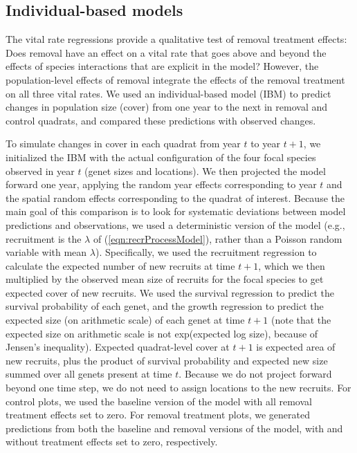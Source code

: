 \documentclass[11pt]{article}
\begin{document}
\begin{doublespacing}
\subsection*{Individual-based models}
The vital rate regressions provide a qualitative test of removal treatment effects: Does removal have an effect on a vital rate that goes above and beyond the effects of species interactions that are explicit in the model? However, the population-level effects of removal integrate the effects of the removal treatment on all three vital rates. We used an individual-based model (IBM) to predict changes in population size (cover) from one year to the next in removal and control quadrats, and compared these predictions with observed changes. 

To simulate changes in cover in each quadrat from year $t$ to year $t+1$, we initialized the IBM with the actual configuration of the four focal species observed in year $t$ (genet sizes and locations). 
We then projected the model forward one year, applying the random year effects corresponding to year $t$ and the spatial random effects corresponding to the quadrat of interest. Because the main goal of this 
comparison is to look for systematic deviations between model predictions and observations, we used a deterministic version of the model (e.g., 
recruitment is the $\lambda$ of (\ref{eqn:recrProcessModel}), rather than a Poisson random variable with mean $\lambda$). Specifically, we used the recruitment regression to calculate 
the expected number of new recruits at time $t+1$, which we then multiplied by the observed mean size of recruits for the focal species to get expected cover of new recruits. 
We used the survival regression to predict the survival probability of each genet, and the growth regression to predict the expected size (on arithmetic scale) of each genet at time $t+1$ (note that the expected size on arithmetic scale is not exp(expected log size), because of Jensen's inequality). 
Expected quadrat-level cover at $t+1$ is expected area of new recruits, plus the product of survival probability and expected new size summed over all genets present at time $t$. 
Because we do not project forward beyond one time step, we do not need to assign locations to the new recruits. For control plots, we used the baseline version of the model with all 
removal treatment effects set to zero. For removal treatment plots, we generated predictions from both the baseline and removal versions of the model, 
with and without treatment effects set to zero, respectively.  


\end{doublespacing}
\end{document}
